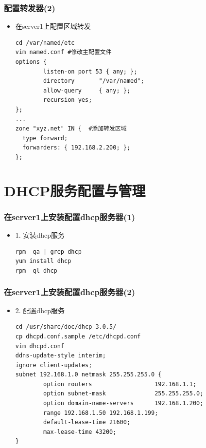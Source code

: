\documentclass[xcolor=svgnames,presentation]{beamer}
\begin{document}
\begin{frame}[fragile]
\frametitle{配置转发器(2)}
\label{sec-1-21}
\begin{itemize}

\item 在server1上配置区域转发\\
\label{sec-1-21-1}%
\begin{verbatim}
cd /var/named/etc
vim named.conf #修改主配置文件
options {
        listen-on port 53 { any; };
        directory       "/var/named";
        allow-query     { any; };
        recursion yes;
};
...
zone "xyz.net" IN {  #添加转发区域
  type forward;
  forwarders: { 192.168.2.200; };
};
\end{verbatim}
\end{itemize} %
\end{frame}
\section{DHCP服务配置与管理}
\label{sec-2}
\begin{frame}[fragile]
\frametitle{在server1上安装配置dhcp服务器(1)}
\label{sec-2-1}
\begin{itemize}

\item 1. 安装dhcp服务\\
\label{sec-2-1-1}%
\begin{verbatim}
rpm -qa | grep dhcp
yum install dhcp
rpm -ql dhcp
\end{verbatim}
\end{itemize} %
\end{frame}
\begin{frame}[fragile]
\frametitle{在server1上安装配置dhcp服务器(2)}
\label{sec-2-2}
\begin{itemize}

\item 2. 配置dhcp服务\\
\label{sec-2-2-1}%
\begin{verbatim}
cd /usr/share/doc/dhcp-3.0.5/
cp dhcpd.conf.sample /etc/dhcpd.conf
vim dhcpd.conf
ddns-update-style interim;
ignore client-updates;
subnet 192.168.1.0 netmask 255.255.255.0 {
        option routers                  192.168.1.1;
        option subnet-mask              255.255.255.0;
        option domain-name-servers      192.168.1.200;
        range 192.168.1.50 192.168.1.199;
        default-lease-time 21600;
        max-lease-time 43200;
}
\end{verbatim}
\end{itemize} %
\end{frame}
\end{document}
